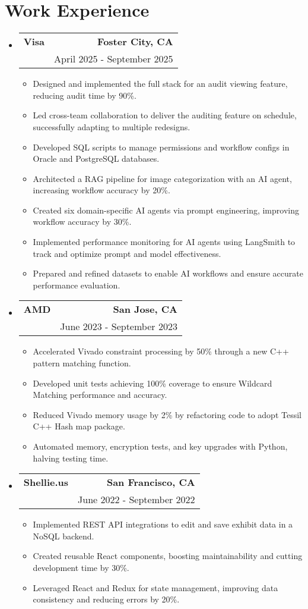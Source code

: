 \documentclass[letterpaper,11pt]{article}
\makeatletter
\newcommand{\resumeItem}[1]{
  \item\small{
    {#1 \vspace{-2pt}}
  }
}
\newcommand{\resumeSubheading}[4]{
  \vspace{-2pt}\item
    \begin{tabular*}{0.97\textwidth}[t]{l@{\extracolsep{\fill}}r}
      \textbf{#1} & #2 \\
      \text{#3} & #4 \\
    \end{tabular*}\vspace{-7pt}
}
\newcommand{\resumeSubHeadingListStart}{\begin{itemize}[leftmargin=0.15in, label={}]}
\newcommand{\resumeSubHeadingListEnd}{\end{itemize}}
\newcommand{\resumeItemListStart}{\begin{itemize}}
\newcommand{\resumeItemListEnd}{\end{itemize}\vspace{-5pt}}
\makeatother
\begin{document}
\section{\textbf{Work Experience}}
  \resumeSubHeadingListStart
    \resumeSubheading
    {Visa}{\textbf{Foster City, CA}}
    {Software Engineer, Java, Typescript, Python, SQL}{April 2025 - September 2025}
    \resumeItemListStart
        \resumeItem{Designed and implemented the full stack for an audit viewing feature, reducing audit time by 90\%.}
        \resumeItem{Led cross-team collaboration to deliver the auditing feature on schedule, successfully adapting to multiple redesigns.}
        \resumeItem{Developed SQL scripts to manage permissions and workflow configs in Oracle and PostgreSQL databases.}
        \resumeItem{Architected a RAG pipeline for image categorization with an AI agent, increasing workflow accuracy by 20\%.}
        \resumeItem{Created six domain-specific AI agents via prompt engineering, improving workflow accuracy by 30\%.}
        \resumeItem{Implemented performance monitoring for AI agents using LangSmith to track and optimize prompt and model effectiveness.}
        \resumeItem{Prepared and refined datasets to enable AI workflows and ensure accurate performance evaluation.}
    \resumeItemListEnd
    \resumeSubheading
    {AMD}{\textbf{San Jose, CA}}
    {Software Engineer Intern, C++, Python}{June 2023 - September 2023}
    \resumeItemListStart
        \resumeItem{Accelerated Vivado constraint processing by 50\% through a new C++ pattern matching function.}
        \resumeItem{Developed unit tests achieving 100\% coverage to ensure Wildcard Matching performance and accuracy.}
        \resumeItem{Reduced Vivado memory usage by 2\% by refactoring code to adopt Tessil C++ Hash map package.}
        \resumeItem{Automated memory, encryption tests, and key upgrades with Python, halving testing time.}
    \resumeItemListEnd
    \resumeSubheading
    {Shellie.us}{\textbf{San Francisco, CA}}
    {Software Engineer Intern, React, JavaScript}{June 2022 - September 2022}
    \resumeItemListStart
        \resumeItem{Implemented REST API integrations to edit and save exhibit data in a NoSQL backend.}
        \resumeItem{Created reusable React components, boosting maintainability and cutting development time by 30\%.}
        \resumeItem{Leveraged React and Redux for state management, improving data consistency and reducing errors by 20\%.}
    \resumeItemListEnd
  \resumeSubHeadingListEnd


\end{document}
